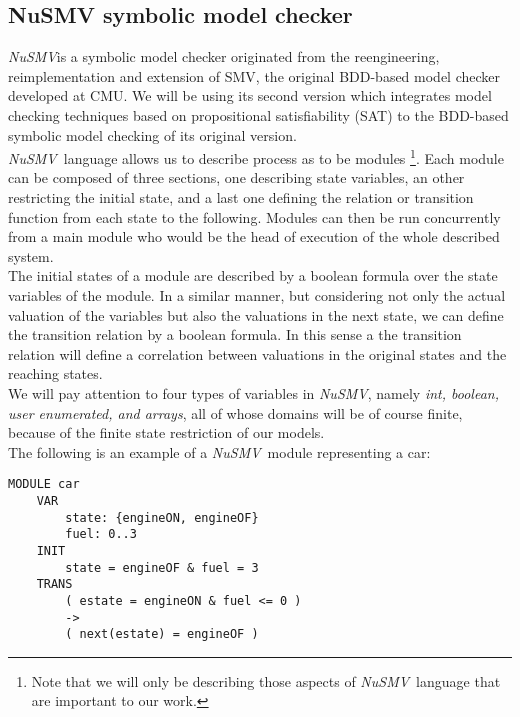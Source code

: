 \documentclass[12pt]{article}
\newcommand{\nusmv}{\mbox{\textit{NuSMV}}}
\begin{document}
\subsection{NuSMV symbolic model checker}\label{nusmv}
\nusmv is a symbolic model checker originated from the reengineering,
reimplementation and extension of SMV, the original BDD-based model checker
developed at CMU\cite{cimatti}. We will be using its second version which
integrates model checking techniques based on propositional satisfiability
(SAT) to the BDD-based symbolic model checking of its original version.\\
\nusmv ~language allows us to describe process as to be modules \footnote{Note
that we will only be describing those aspects of \nusmv ~language that are
important to our work.}. Each module
can be composed of three sections, one describing state variables, an other
restricting the initial state, and a last one defining the relation or
transition function from each state to the following. Modules can then be run
concurrently from a main module who would be the head of execution of the whole
described system.\\
The initial states of a module are described by a boolean formula over the
state variables of the module. In a similar manner, but considering not
only the actual valuation of the variables but also the valuations in
the next state, we can define the transition relation by a boolean formula.
In this sense a the transition relation will define a correlation between
valuations in the original states and the reaching states.\\
We will pay attention to four types of variables in \nusmv, namely \emph{int,
boolean, user enumerated, and arrays}, all of whose domains will be of course
finite, because of the finite state restriction of our models.\\
The following is an example of a \nusmv ~module representing a car:

\begin{verbatim}
MODULE car
    VAR
        state: {engineON, engineOF}
        fuel: 0..3
    INIT
        state = engineOF & fuel = 3
    TRANS
        ( estate = engineON & fuel <= 0 ) 
        -> 
        ( next(estate) = engineOF )
\end{verbatim}
\end{document}
